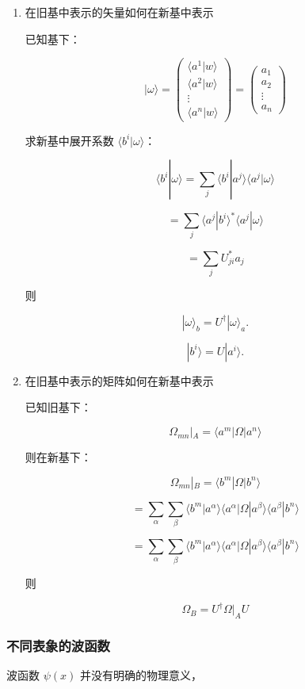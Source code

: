 \documentclass[lang=cn,10pt]{elegantbook}
\begin{document}
\begin{enumerate}
	\item 在旧基中表示的矢量如何在新基中表示
	
	已知基下： 
	
	\[
	| \omega \rangle = \begin{pmatrix} \langle a^{1} | w \rangle \\ \langle a^{2} | w \rangle \\ \vdots \\ \langle a^{n} | w \rangle \end{pmatrix} = \begin{pmatrix} a_1 \\ a_2 \\ \vdots \\ a_n \end{pmatrix}
	\]
	
	求新基中展开系数 $\langle b^{i} | \omega \rangle$：
	
	\[
	\langle b^{i} | \omega \rangle = \sum_j \langle b^{i} | a^{j} \rangle \langle a^{j} | \omega \rangle
	\]
	
	\[
		= \sum_j \langle a^{j} | b^{i} \rangle^* \langle a^{j} | \omega \rangle
	\]
	
	\[
	= \sum_j U_{ji}^* a_j
	\]
	

	
	则 
	
	\[
	|  \omega \rangle_b = U^{\dagger} | \omega \rangle_a.
	\]
	
		\[
	|  b^i \rangle = U | a^i \rangle.
	\]
	
	\item 在旧基中表示的矩阵如何在新基中表示
	
	已知旧基下：
	
	\[
	\Omega_{mn} | _A  = \langle a^{m} | \Omega | a^{n} \rangle
	\]
	
	则在新基下：
	
	\[
	\Omega_{mn} |_B = \langle b^{m} | \Omega | b^{n} \rangle
	\]
	
	\[
		= \sum_{\alpha} \sum_{\beta} \langle b^{m} | a^{\alpha} \rangle \langle a^{\alpha} | \Omega | a^{\beta} \rangle \langle a^{\beta} | b^{n} \rangle
	\]
	
	\[
		= \sum_{\alpha} \sum_{\beta} \langle b^{m} | a^{\alpha} \rangle \langle a^{\alpha} | \Omega | a^{\beta} \rangle \langle a^{\beta} | b^{n} \rangle
	\]
	
	则 
	
	\[
	 \Omega _B = U^{\dagger} \Omega|_A U
	\]
\end{enumerate}
\subsubsection{不同表象的波函数}
波函数 $\psi(x)$ 并没有明确的物理意义， 
\end{document}
